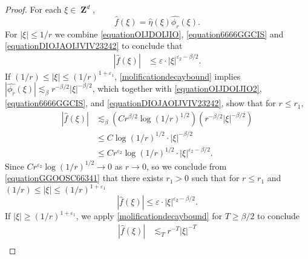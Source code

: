 \documentclass[12pt,reqno]{article}
\numberwithin{equation}{section}
\DeclareMathOperator{\ZZ}{\mathbf{Z}}
\numberwithin{theorem}{section}
\begin{document}
\begin{proof}
    For each $\xi \in \ZZ^d$,
    \begin{equation} \label{equation6666GGCIS}
        \widehat{f}(\xi) = \widehat{\eta}(\xi) \widehat{\phi_r}(\xi).
    \end{equation}
    For $|\xi| \leq 1/r$ we combine \eqref{equationOIJDOIJIO}, \eqref{equation6666GGCIS} and \eqref{equationDIOJAOIJVIV23242} to conclude that
    \begin{equation} \label{equationGGIOHISI99234}
    \begin{split}
        |\widehat{f}(\xi)| &\leq \varepsilon \cdot |\xi|^{\varepsilon_2 - \beta/2}.
    \end{split}
    \end{equation}
    If $(1/r) \leq |\xi| \leq (1/r)^{1+\varepsilon_1}$, \eqref{molificationdecaybound} implies $|\widehat{\phi_{r}}(\xi)| \lesssim_\beta r^{-\beta/2} |\xi|^{-\beta/2}$, which together with \eqref{equationOIJDOIJIO2}, \eqref{equation6666GGCIS}, and \eqref{equationDIOJAOIJVIV23242}, show that for $r \leq r_1$,
    \begin{equation} \label{equationGGOOSC66341}
    \begin{split}
        |\widehat{f}(\xi)| &\lesssim_\beta \left( C r^{\beta/2} \log(1/r)^{1/2} \right) \left( r^{-\beta/2} |\xi|^{-\beta/2} \right)\\
        &\leq C \log(1/r)^{1/2} \cdot |\xi|^{-\beta/2}\\
        &\leq C r^{\varepsilon_2} \log(1/r)^{1/2} \cdot |\xi|^{\varepsilon_2-\beta/2}.
    \end{split}
    \end{equation}
    Since $C r^{\varepsilon_2} \log(1/r)^{1/2} \to 0$ as $r \to 0$, so we conclude from \eqref{equationGGOOSC66341} that there exists $r_1 > 0$ such that for $r \leq r_1$ and $(1/r) \leq |\xi| \leq (1/r)^{1 + \varepsilon_1}$
    \begin{equation} \label{equationUUUDDDCII777}
        |\widehat{f}(\xi)| \leq \varepsilon \cdot |\xi|^{\varepsilon_2-\beta/2}.
    \end{equation}
    If $|\xi| \geq (1/r)^{1 + \varepsilon_1}$, we apply \eqref{molificationdecaybound} for $T \geq \beta/2$ to conclude
    \begin{equation} \label{equationGGUSCCCYVSSXX998723}
    \begin{split}
        |\widehat{f}(\xi)| &\lesssim_T r^{-T} |\xi|^{-T}\\

\end{split}
\end{equation}
\end{proof}
\end{document}
